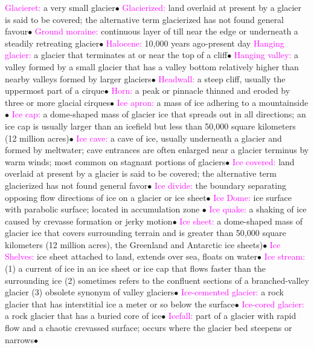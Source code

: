 \documentclass{article}
\newcommand{\ddd}{$\bullet$}
\newcommand{\pink}[1]{\textcolor{magenta}{#1}}
\newcommand{\vocab}[1]{{\pink{#1}}}
\begin{document}
\begin{multicols*}{4}
		\vocab{        Glacieret: } a very small glacier\ddd
		\vocab{        Glacierized: } land overlaid at present by a glacier is said to be covered; the alternative term glacierized has not found general favour\ddd
		\vocab{        Ground moraine: } continuous layer of till near the edge or underneath a steadily retreating glacier\ddd
		\vocab{ Halocene: } 10,000 years ago-present day
		\vocab{        Hanging glacier: } a glacier that terminates at or near the top of a cliff\ddd
		\vocab{        Hanging valley: } a valley formed by a small glacier that has a valley bottom relatively higher than nearby valleys formed by larger glaciers\ddd
		\vocab{        Headwall: } a steep cliff, usually the uppermost part of a cirque\ddd
		\vocab{        Horn: } a peak or pinnacle thinned and eroded by three or more glacial cirques\ddd
		\vocab{        Ice apron: } a mass of ice adhering to a mountainside\ddd
		\vocab{        Ice cap: } a dome-shaped mass of glacier ice that spreads out in all directions; an ice cap is usually larger than an icefield but less than 50,000 square kilometers (12 million acres)\ddd
		\vocab{        Ice cave: } a cave of ice, usually underneath a glacier and formed by meltwater; cave entrances are often enlarged near a glacier terminus by warm winds; most common on stagnant portions of glaciers\ddd
		\vocab{        Ice covered: } land overlaid at present by a glacier is said to be covered; the alternative term glacierized has not found general favor\ddd
		\vocab{        Ice divide: } the boundary separating opposing flow directions of ice on a glacier or ice sheet\ddd
		\vocab{        Ice Dome: } ice surface with parabolic surface; located in accumulation zone \ddd 
		\vocab{        Ice quake: } a shaking of ice caused by crevasse formation or jerky motion\ddd
		\vocab{        Ice sheet: } a dome-shaped mass of glacier ice that covers surrounding terrain and is greater than 50,000 square kilometers (12 million acres), the Greenland and Antarctic ice sheets)\ddd
		\vocab{ Ice Shelves: }ice sheet attached to land, extends over sea, floats on water\ddd
		\vocab{        Ice stream: } (1) a current of ice in an ice sheet or ice cap that flows faster than the surrounding ice (2) sometimes refers to the confluent sections of a branched-valley glacier (3) obsolete synonym of valley glaciers\ddd
		\vocab{        Ice-cemented glacier: } a rock glacier that has interstitial ice a meter or so below the surface\ddd
		\vocab{        Ice-cored glacier: } a rock glacier that has a buried core of ice\ddd
		\vocab{        Icefall: } part of a glacier with rapid flow and a chaotic crevassed surface; occurs where the glacier bed steepens or narrows\ddd

\end{multicols*}
\end{document}
